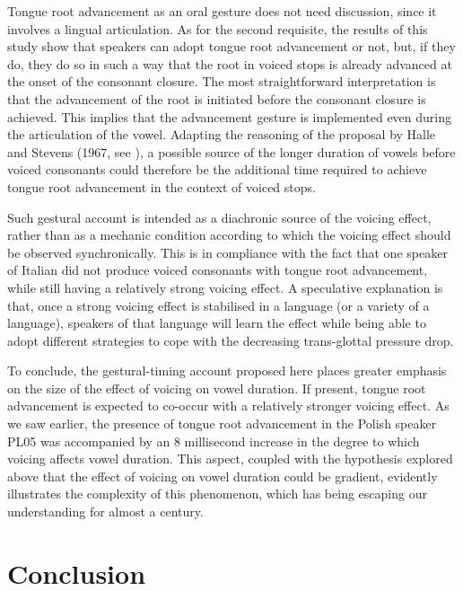 \documentclass[authoryear, 5p]{elsarticle}
\begin{document}
Tongue root advancement as an oral gesture does not need discussion,
since it involves a lingual articulation. As for the second requisite,
the results of this study show that speakers can adopt tongue root
advancement or not, but, if they do, they do so in such a way that the
root in voiced stops is already advanced at the onset of the consonant
closure. The most straightforward interpretation is that the advancement
of the root is initiated before the consonant closure is achieved. This
implies that the advancement gesture is implemented even during the
articulation of the vowel. Adapting the reasoning of the proposal by
Halle and Stevens (1967, see ), a possible source of the
longer duration of vowels before voiced consonants could therefore be
the additional time required to achieve tongue root advancement in the
context of voiced stops.

Such gestural account is intended as a diachronic source of the voicing
effect, rather than as a mechanic condition according to which the
voicing effect should be observed synchronically. This is in compliance
with the fact that one speaker of Italian did not produce voiced
consonants with tongue root advancement, while still having a relatively
strong voicing effect. A speculative explanation is that, once a strong
voicing effect is stabilised in a language (or a variety of a language),
speakers of that language will learn the effect while being able to
adopt different strategies to cope with the decreasing trans-glottal
pressure drop.

To conclude, the gestural-timing account proposed here places greater
emphasis on the size of the effect of voicing on vowel duration. If
present, tongue root advancement is expected to co-occur with a
relatively stronger voicing effect. As we saw earlier, the presence of
tongue root advancement in the Polish speaker PL05 was accompanied by an
8 millisecond increase in the degree to which voicing affects vowel
duration. This aspect, coupled with the hypothesis explored above that
the effect of voicing on vowel duration could be gradient, evidently
illustrates the complexity of this phenomenon, which has being escaping
our understanding for almost a century.

\section{Conclusion}\label{conclusion}

\label{s:conclusion}
\end{document}
